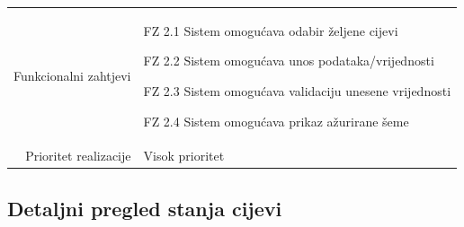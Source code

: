 \documentclass[]{report}
\begin{document}
\begin{tabular}{rp{}}
\\
Funkcionalni zahtjevi &
 
\begin{compactitem}
  \item FZ 2.1 Sistem omogućava odabir željene cijevi 
    \item FZ 2.2 Sistem omogućava unos podataka/vrijednosti
    \item FZ 2.3 Sistem omogućava validaciju unesene vrijednosti
    \item FZ 2.4 Sistem omogućava prikaz ažurirane šeme
\end{compactitem}
 
\\
Prioritet realizacije &
\hspace{12pt} Visok prioritet

\end{tabular}
 


\newpage %


\subsection{Detaljni pregled stanja cijevi}

\end{document}
